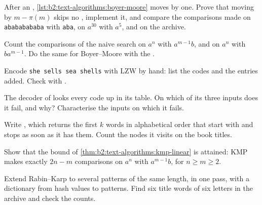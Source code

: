 \begin{exercise}[$\star$]\label{exo:b2:text-algorithms:3}
After an , \cref{lst:b2:text-algorithms:boyer-moore} moves by one. Prove that moving by $m - \pi(m)$ skips no
, implement it, and compare the comparisons made on \texttt{abababababa} with \texttt{aba}, on $a^{30}$ with
$a^5$, and on the archive.
\end{exercise}

\begin{exercise}[$\star$]\label{exo:b2:text-algorithms:4}
Count the comparisons of the naive search on $a^n$ with $a^{m-1}b$, and on $a^n$ with $ba^{m-1}$. Do the same for
Boyer--Moore with the .
\end{exercise}

\begin{exercise}[$\star\star$]\label{exo:b2:text-algorithms:5}
Encode \texttt{she sells sea shells} with LZW by hand: list the codes and the entries added. Check with
.
\end{exercise}

\begin{exercise}[$\star\star$]\label{exo:b2:text-algorithms:6}
The decoder of  looks every code up in its table. On which of its three inputs does it fail, and
why? Characterise the inputs on which it fails.
\end{exercise}

\begin{exercise}[$\star\star$]\label{exo:b2:text-algorithms:7}
Write , which returns the first $k$ words in alphabetical order that start with
 and stops as soon as it has them. Count the nodes it visits on the book titles.
\end{exercise}

\begin{exercise}[$\star\star$]\label{exo:b2:text-algorithms:8}
Show that the bound of \cref{thm:b2:text-algorithms:kmp-linear} is attained: KMP makes exactly $2n - m$ comparisons on
$a^n$ with $a^{m-1}b$, for $n \geq m \geq 2$.
\end{exercise}

\begin{exercise}[$\star\star$]\label{exo:b2:text-algorithms:9}
Extend Rabin--Karp to several patterns of the same length, in one pass, with a dictionary from hash values to patterns.
Find six title words of six letters in the archive and check the counts.
\end{exercise}

